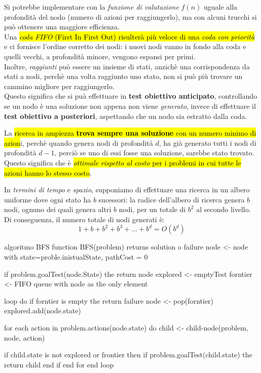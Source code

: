 \documentclass[12pt, a4paper, oneside]{book}
\begin{document}
    Si potrebbe implementare con la \textit{funzione di valutazione} $f(n)$ uguale alla profondità del nodo (numero di azioni per raggiungerlo), ma con alcuni trucchi si può ottenere una maggiore efficienza. \\[0.2ex]
    Una \hl{\textit{coda FIFO} (First In First Out) risulterà più veloce di una \textit{coda con priorità}} e ci fornisce l'ordine corretto dei nodi: i nuovi nodi vanno in fondo alla coda e quelli vecchi, a profondità minore, vengono espansi per primi. \\[0.2ex]
    Inoltre, \textit{raggiunti} può essere un insieme di stati, anzichè una corrispondenza da stati a nodi, perchè una volta raggiunto uno stato, non si può più trovare un cammino migliore per raggiungerlo. \\[0.2ex]
    Questo significa che si puà effettuare in \textbf{test obiettivo anticipato}, controllando se un nodo è una soluzione non appena non viene \textit{generato}, invece di effettuare il \textbf{test obiettivo a posteriori}, aspettando che un nodo sia estratto dalla coda.

    La \hl{ricerca in ampiezza \textbf{trova sempre una soluzione} con un numero minimo di azion}i, perchè quando genera nodi di profondità $d$, ha già generato tutti i nodi di profondità $d-1$, perciò se uno di essi fosse una soluzione, sarebbe stato trovato. \\[0.2ex]
    Questo significa che è \hl{\textit{ottimale rispetto al costo} per i problemi in cui tutte le azioni hanno lo stesso costo}.

    In \textit{termini di tempo} e \textit{spazio}, supponiamo di effettuare una ricerca in un albero uniforme dove ogni stato ha $b$ sucessori: la radice dell'albero di ricerca genera $b$ nodi, ognuno dei quali genera altri $b$ nodi, per un totale di $b^2$ al secondo livello. \\[0.2ex]
    Di conseguenza, il numero totale di nodi generati è:
    \begin{equation*}
      1 + b + b^2 + b^3 + \dots + b^d = O(b^d)
    \end{equation*}


    \begin{codice}[python]{algoritmo BFS}
      function BFS(problem) returns solution o failure
        node <- node with state=proble.inistualState, pathCost = 0

        if problem.goalTest(node.State) the return node
          explored <- emptyTest
          forntier <- FIFO queue with node as the only element
        
        loop do
          if forntier is empty the return failure
            node <- pop(forntier)
            explored.add(node.state)

            for each action in problem.actions(node.state) do
              child <- child-node(problem, node, action)

              if child.state is not explored or frontier then
                if problem.goalTest(child.state) the return child
              end if
            end for
        end loop
    \end{codice}
\end{document}
